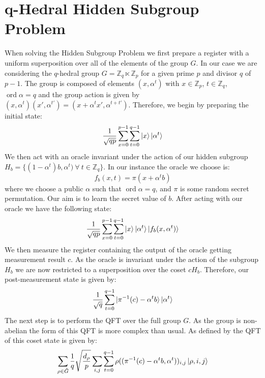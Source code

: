 \documentclass[aps,floatfix,10pt,amssymb,amsfont,amsmath,superscriptaddress,float,nofootinbib,longbibliography,nobalancelastpage,twocolumn]{revtex4-2}
\begin{document}
\section{q-Hedral Hidden Subgroup Problem}
\label{section:theory}
When solving the Hidden Subgroup Problem we first prepare a register with a uniform superposition over all of the elements of the group $G$. In our case we are considering the $q$-hedral group $G= \mathbb{Z}_q \ltimes \mathbb{Z}_p$ for a given prime $p$ and divisor $q$ of $p-1$. The group is composed of elements $(x,\alpha^t)$ with $x \in \mathbb{Z}_p$, $t \in \mathbb{Z}_q$, $\operatorname{ord}\alpha = q$ and the group action is given by $(x,\alpha^t)(x',\alpha^{t'}) = (x+\alpha^tx', \alpha^{t+t'})$. Therefore, we begin by preparing the initial state:
\begin{equation}
    \frac{1}{\sqrt{qp}}\sum_{x = 0}^{p-1}\sum_{t=0}^{q-1} \ket{x}\ket{\alpha^t}
    \label{eq:initialstate}
\end{equation}
We then act with an oracle invariant under the action of our hidden subgroup $H_b = \{(1-\alpha^t)b, \alpha^t) \>\forall\> t \in \mathbb{Z}_q\}$. In our instance the oracle we choose is:
\begin{equation}
    f_b(x,t) = \pi(x + \alpha^t b)
\end{equation}
where we choose a public $\alpha$ such that $\operatorname{ord}\alpha = q$, and $\pi$ is some random secret permutation. Our aim is to learn the secret value of $b$. After acting with our oracle we have the following state:
\begin{equation}
        \frac{1}{\sqrt{qp}}\sum_{x = 0}^{p-1}\sum_{t=0}^{q-1} \ket{x}\ket{\alpha^t}\ket{f_b(x,\alpha^t)}
\end{equation}
We then measure the register containing the output of the oracle getting measurement result $c$. As the oracle is invariant under the action of the subgroup $H_b$ we are now restricted to a superposition over the coset $cH_b$. Therefore, our post-measurement state is given by:
\begin{equation}
    \frac{1}{\sqrt{q}} \sum_{t=0}^{q-1}\ket{\pi^{-1}(c) - \alpha^tb}\ket{\alpha^t}
\end{equation}
The next step is to perform the QFT over the full group $G$. As the group is non-abelian the form of this QFT is more complex than usual. As defined by \cite{hallgren2000normal} the QFT of this coset state is given by:
\begin{equation}
    \sum_{\rho \in \tilde G} \frac{1}{q}\sqrt{\frac{d_{\rho}}{p}}\sum_{i,j}\sum_{t=0}^{q-1} \rho((\pi^{-1}(c) - \alpha^tb,\alpha^t))_{i,j} \ket{\rho,i,j}
    \label{eq:qftofcoset}
\end{equation}
\end{document}

